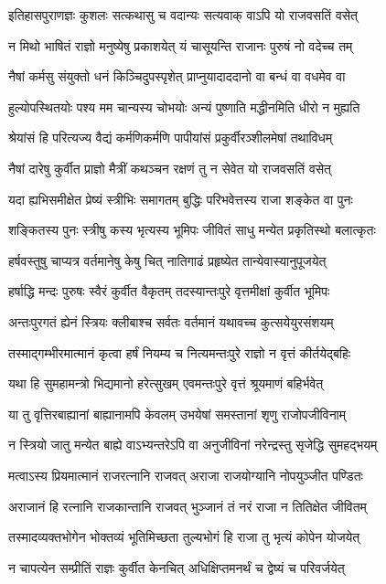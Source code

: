 \twolineshloka
{इतिहासपुराणज्ञः कुशलः सत्कथासु च}
{वदान्यः सत्यवाक् वाऽपि यो राजवसतिं वसेत्}


\twolineshloka
{न मिथो भाषितं राज्ञो मनुष्येषु प्रकाशयेत्}
{यं चासूयन्ति राजानः पुरुषं नो वदेच्च तम्}


\twolineshloka
{नैषां कर्मसु संयुक्तो धनं किञ्चिदुपस्पृशेत्}
{प्राप्नुयादाददानो वा बन्धं वा वधमेव वा}


\twolineshloka
{हुल्योपस्थितयोः पश्य मम चान्यस्य चोभयोः}
{अन्यं पुष्णाति मद्धीनमिति धीरो न मुह्यति}


\twolineshloka
{श्रेयांसं हि परित्यज्य वैद्यं कर्मणिकर्मणि}
{पापीयांसं प्रकुर्वीरञ्शीलमेषां तथाविधम्}


\twolineshloka
{नैषां दारेषु कुर्वीत प्राज्ञो मैत्रीं कथञ्चन}
{रक्षणं तु न सेवेत यो राजवसतिं वसेत्}


\twolineshloka
{यदा ह्यभिसमीक्षेत प्रेष्यं स्त्रीभिः समागतम्}
{बुद्धिः परिभवेत्तस्य राजा शङ्केत वा पुनः}


\twolineshloka
{शङ्कितस्य पुनः स्त्रीषु कस्य भृत्यस्य भूमिपः}
{जीवितं साधु मन्येत प्रकृतिस्थो बलात्कृतः}


\twolineshloka
{हर्षवस्तुषु चाप्यत्र वर्तमानेषु केषु चित्}
{नातिगाढं प्रहृष्येत तान्येवास्यानुपूजयेत्}


\twolineshloka
{हर्षाद्धि मन्दः पुरुषः स्वैरं कुर्वीत वैकृतम्}
{तदस्यान्तःपुरे वृत्तमीक्षां कुर्वीत भूमिपः}


\twolineshloka
{अन्तःपुरगतं ह्येनं स्त्रियः क्लीबाश्च सर्वतः}
{वर्तमानं यथावच्च कुत्सयेयुरसंशयम्}


\twolineshloka
{तस्माद्गम्भीरमात्मानं कृत्वा हर्षं नियम्य च}
{नित्यमन्तःपुरे राज्ञो न वृत्तं कीर्तयेद्बहिः}


\twolineshloka
{यथा हि सुमहामन्त्रो भिद्यमानो हरेत्सुखम्}
{एवमन्तःपुरे वृत्तं श्रूयमाणं बहिर्भवेत्}


\twolineshloka
{या तु वृत्तिरबाह्यानां बाह्यानामपि केवलम्}
{उभयेषां समस्तानां शृणु राजोपजीविनाम्}


\twolineshloka
{न स्त्रियो जातु मन्येत बाह्ये वाऽभ्यन्तरेऽपि वा}
{अनुजीविनां नरेन्द्रस्तु सृजेद्धि सुमहद्भयम्}


\twolineshloka
{मत्वाऽस्य प्रियमात्मानं राजरत्नानि राजवत्}
{अराजा राजयोग्यानि नोपयुञ्जीत पण्डितः}


\twolineshloka
{अराजानं हि रत्नानि राजकान्तानि राजवत्}
{भुञ्जानं तं नरं राजा न तितिक्षेत जीवितम्}


\twolineshloka
{तस्मादव्यक्तभोगेन भोक्तव्यं भूतिमिच्छता}
{तुल्यभोगं हि राजा तु भृत्यं कोपेन योजयेत्}


\twolineshloka
{न चापत्येन सम्प्रीतिं राज्ञः कुर्वीत केनचित्}
{अधिक्षिप्तमनर्थं च द्वेष्यं च परिवर्जयेत्}


